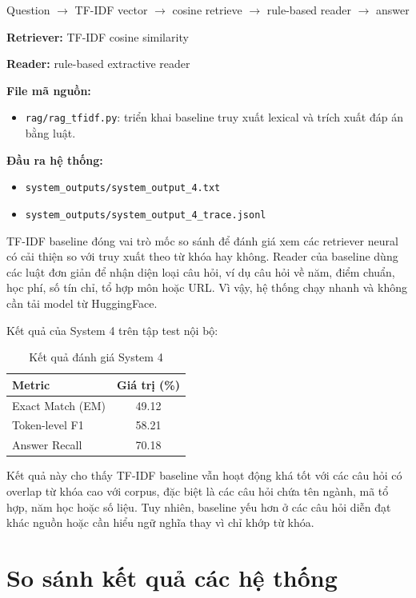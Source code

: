 \documentclass[12pt,a4paper]{report}
\begin{document}
\begin{center}
Question $\rightarrow$ TF-IDF vector $\rightarrow$ cosine retrieve $\rightarrow$ rule-based reader $\rightarrow$ answer
\end{center}

\textbf{Retriever:} TF-IDF cosine similarity

\textbf{Reader:} rule-based extractive reader

\textbf{File mã nguồn:}
\begin{itemize}
    \item \texttt{rag/rag\_tfidf.py}: triển khai baseline truy xuất lexical và trích xuất đáp án bằng luật.
\end{itemize}

\textbf{Đầu ra hệ thống:}
\begin{itemize}
    \item \texttt{system\_outputs/system\_output\_4.txt}
    \item \texttt{system\_outputs/system\_output\_4\_trace.jsonl}
\end{itemize}

TF-IDF baseline đóng vai trò mốc so sánh để đánh giá xem các retriever neural có cải thiện so với truy xuất theo từ khóa hay không. Reader của baseline dùng các luật đơn giản để nhận diện loại câu hỏi, ví dụ câu hỏi về năm, điểm chuẩn, học phí, số tín chỉ, tổ hợp môn hoặc URL. Vì vậy, hệ thống chạy nhanh và không cần tải model từ HuggingFace.

Kết quả của System 4 trên tập test nội bộ:

\begin{table}[H]
\centering
\caption{Kết quả đánh giá System 4}
\begin{tabular}{|l|c|}
\hline
\textbf{Metric} & \textbf{Giá trị (\%)} \\
\hline
Exact Match (EM) & 49.12 \\
\hline
Token-level F1 & 58.21 \\
\hline
Answer Recall & 70.18 \\
\hline
\end{tabular}
\end{table}

Kết quả này cho thấy TF-IDF baseline vẫn hoạt động khá tốt với các câu hỏi có overlap từ khóa cao với corpus, đặc biệt là các câu hỏi chứa tên ngành, mã tổ hợp, năm học hoặc số liệu. Tuy nhiên, baseline yếu hơn ở các câu hỏi diễn đạt khác nguồn hoặc cần hiểu ngữ nghĩa thay vì chỉ khớp từ khóa.

\section{So sánh kết quả các hệ thống}
\end{document}
